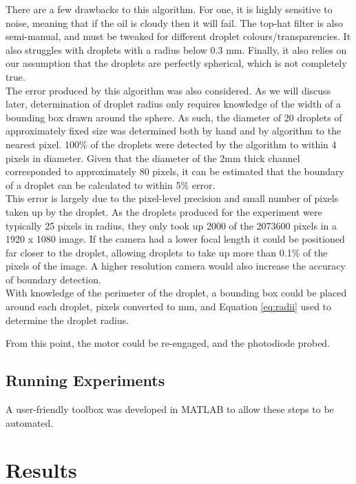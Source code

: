 \documentclass{physics_article_B}
\begin{document}
            There are a few drawbacks to this algorithm. For one, it is highly sensitive to noise, meaning that if the oil is cloudy then it will fail. The top-hat filter is also semi-manual, and must be tweaked for different droplet colours/transparencies. It also struggles with droplets with a radius below 0.3 mm. Finally, it also relies on our assumption that the droplets are perfectly spherical, which is not completely true.\\
            
            The error produced by this algorithm was also considered. As we will discuss later, determination of droplet radius only requires knowledge of the width of a bounding box drawn around the sphere. As such, the diameter of 20 droplets of approximately fixed size was determined both by hand and by algorithm to the nearest pixel. 100\% of the droplets were detected by the algorithm to within 4 pixels in diameter. Given that the diameter of the 2mm thick channel corresponded to approximately 80 pixels, it can be estimated that the boundary of a droplet can be calculated to within 5\% error. \\
            
            This error is largely due to the pixel-level precision and small number of pixels taken up by the droplet. As the droplets produced for the experiment were typically 25 pixels in radius, they only took up 2000 of the 2073600 pixels in a 1920 x 1080 image. If the camera had a lower focal length it could be positioned far closer to the droplet, allowing droplets to take up more than 0.1\% of the pixels of the image. A higher resolution camera would also increase the accuracy of boundary detection. \\
            
            With knowledge of the perimeter of the droplet, a bounding box could be placed around each droplet, pixels converted to mm, and Equation \ref{eq:radii} used to determine the droplet radius.
            
            From this point, the motor could be re-engaged, and the photodiode probed.

    \subsection{Running Experiments}
    A user-friendly toolbox was developed in MATLAB to allow these steps to be automated.
    
\section{Results}
    
\end{document}
